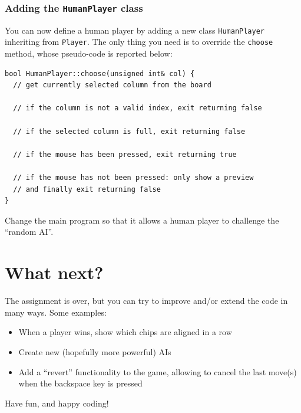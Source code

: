 \documentclass{article}
\begin{document}
\subsubsection{Adding the \texttt{HumanPlayer} class}

You can now define a human player by adding a new class \texttt{HumanPlayer} inheriting from \texttt{Player}. The only thing you need is to override the \texttt{choose} method, whose pseudo-code is reported below:
\begin{center}
\begin{minipage}{.9\textwidth}
\begin{lstlisting}[style=mycpp,numbers=none]
bool HumanPlayer::choose(unsigned int& col) {
  // get currently selected column from the board
  
  // if the column is not a valid index, exit returning false
  
  // if the selected column is full, exit returning false
  
  // if the mouse has been pressed, exit returning true
  
  // if the mouse has not been pressed: only show a preview
  // and finally exit returning false
}
\end{lstlisting}
\end{minipage}
\end{center}

Change the main program so that it allows a human player to challenge the ``random AI''.


\section*{What next?}

The assignment is over, but you can try to improve and/or extend the code in many ways. Some examples:
\begin{itemize}
  \item When a player wins, show which chips are aligned in a row
  \item Create new (hopefully more powerful) AIs
  \item Add a ``revert'' functionality to the game, allowing to cancel the last move(s) when the backspace key is pressed
\end{itemize}

Have fun, and happy coding!
\end{document}
